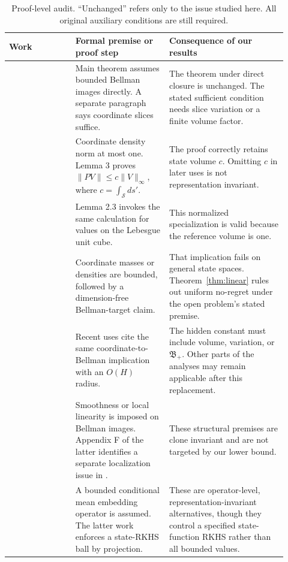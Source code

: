 \documentclass{article}
\newcommand{\cS}{\mathcal S}
\newcommand{\Bpos}{\mathfrak B_{+}}
\begin{document}
\begin{table}[H]
\centering
\small \setlength{\tabcolsep}{4pt}
\begin{tabular}{>{\raggedright\arraybackslash}p{0.22\linewidth}
                >{\raggedright\arraybackslash}p{0.31\linewidth}
                >{\raggedright\arraybackslash}p{0.39\linewidth}}
\toprule
Work & Formal premise or proof step & Consequence of our results \\
\midrule
\citet{yang2020kernel}
& Main theorem assumes bounded Bellman images directly. A separate paragraph says coordinate slices suffice.
& The theorem under direct closure is unchanged. The stated sufficient condition needs slice variation or a finite volume factor. \\
\citet{yeh2023sample}
& Coordinate density norm at most one. Lemma 3 proves $\|PV\|\leq c\|V\|_\infty$, where $c=\int_{\cS}ds'$.
& The proof correctly retains state volume $c$. Omitting $c$ in later uses is not representation invariant. \\
\citet{vakili2024rewardfree}
& Lemma 2.3 invokes the same calculation for values on the Lebesgue unit cube.
& This normalized specialization is valid because the reference volume is one. \\
\citet{vakili2023kernel,vakili2024average,vakili2024open}
& Coordinate masses or densities are bounded, followed by a dimension-free Bellman-target claim.
& That implication fails on general state spaces. Theorem~\ref{thm:linear} rules out uniform no-regret under the open problem's stated premise. \\
\citet{kayal2025rewardfree,cioba2026invariances,pavlovic2026preferences}
& Recent uses cite the same coordinate-to-Bellman implication with an $O(H)$ radius.
& The hidden constant must include volume, variation, or $\Bpos$. Other parts of the analyses may remain applicable after this replacement. \\
\citet{maran2024local,maran2024smooth}
& Smoothness or local linearity is imposed on Bellman images. Appendix F of the latter identifies a separate localization issue in \citet{vakili2023kernel}.
& These structural premises are clone invariant and are not targeted by our lower bound. \\
\citet{chowdhury2023cme,kumar2025closure}
& A bounded conditional mean embedding operator is assumed. The latter work enforces a state-RKHS ball by projection.
& These are operator-level, representation-invariant alternatives, though they control a specified state-function RKHS rather than all bounded values. \\
\bottomrule
\end{tabular}
\caption{Proof-level audit. ``Unchanged'' refers only to the issue studied here.
All original auxiliary conditions are still required.}
\label{tab:audit}
\end{table}
\end{document}
